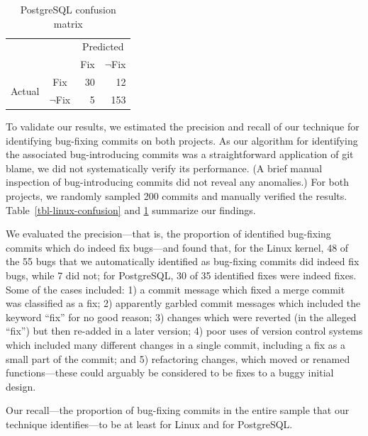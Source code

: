\begin{table}
\begin{center}
\begin{tabular}{rrrr}
& & \multicolumn{2}{c}{Predicted} \\
& & \multicolumn{1}{|c}{Fix} & \multicolumn{1}{c}{$\neg$Fix} \\ \cline{2-4}
\multirow{2}{*}{Actual} & \multicolumn{1}{c|}{Fix} &  30 & 12\\
                        &  \multicolumn{1}{c|}{$\neg$Fix} & 5 & 153 \\
\end{tabular}
\end{center}
\caption{\label{tbl-postgresql-confusion}PostgreSQL confusion matrix}
\end{table}

To validate our results, we estimated the precision and recall of our technique
for identifying bug-fixing commits on both projects.  As our algorithm for
identifying the associated bug-introducing commits was a straightforward
application of git blame, we did not systematically verify its performance. (A
brief manual inspection of bug-introducing commits did not reveal any
anomalies.)  For both projects, we randomly sampled 200 commits and manually
verified the results. Table~\ref{tbl-linux-confusion} and
\ref{tbl-postgresql-confusion} summarize our findings.

We evaluated the precision---that is, the proportion of identified bug-fixing
commits which do indeed fix bugs---and found that, for the Linux kernel, 48 of
the 55 bugs that we automatically identified as bug-fixing commits did indeed
fix bugs, while 7 did not; for PostgreSQL, 30 of 35 identified fixes were indeed
fixes.  Some of the cases included: 1) a commit message which fixed a merge
commit was classified as a fix; 2) apparently garbled commit messages which
included the keyword ``fix'' for no good reason; 3) changes which were reverted
(in the alleged ``fix'') but then re-added in a later version; 4) poor uses of
version control systems which included many different changes in a single
commit, including a fix as a small part of the commit; and 5) refactoring
changes, which moved or renamed functions---these could arguably be considered
to be fixes to a buggy initial design.

Our recall---the proportion of bug-fixing commits in the entire sample that our
technique identifies---to be at least \linuxR for Linux and \postR for
PostgreSQL.
